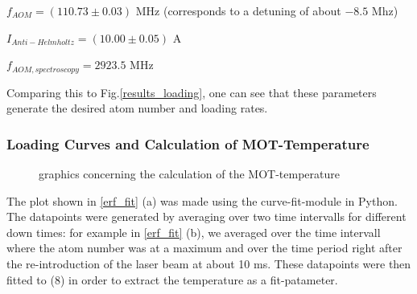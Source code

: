 \documentclass[12pt, a4paper]{article}
\begin{document}
\bigskip
$f_{AOM}=(110.73 \pm 0.03)$ MHz (corresponds to a detuning of about $-8.5$ Mhz)

$I_{Anti-Helmholtz}=(10.00 \pm 0.05)$ A

$f_{AOM, spectroscopy}=2923.5$ MHz

\bigskip
Comparing this to Fig.\ref{results_loading}, one can see that these parameters generate the desired atom number and loading rates.

\subsubsection{Loading Curves and Calculation of MOT-Temperature}

\begin{figure}[h]
\centering
\caption{graphics concerning the calculation of the MOT-temperature}
	\label{erf_fit}
\end{figure}

The plot shown in \autoref{erf_fit} (a) was made using the curve-fit-module in
Python. The datapoints were generated by averaging over two time intervalls for
different down times: for example in \autoref{erf_fit} (b), we averaged over the
time intervall where the atom number was at a maximum and over the time period
right after the re-introduction of the laser beam at about 10 ms. These datapoints were then fitted to (8) in order to extract the temperature as a fit-patameter.
\end{document}
